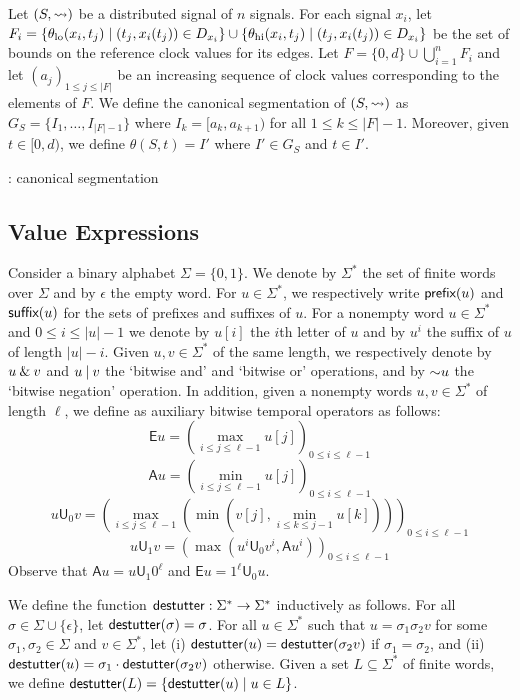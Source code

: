 Let $(S,{\rightsquigarrow})$ be a distributed signal of $n$ signals.
For each signal $x_i$, let $F_i = \{\theta_{\text{lo}}(x_i, t_j) \st (t_j, x_i(t_j)) \in D_{x_i}\} \cup \{\theta_{\text{hi}}(x_i, t_j) \st (t_j, x_i(t_j)) \in D_{x_i}\}$ be the set of bounds on the reference clock values for its edges.
Let $F = \{0, d\} \cup \bigcup_{i = 1}^{n} F_i$ and let $(a_j)_{1 \leq j \leq |F|}$ be an increasing sequence of clock values corresponding to the elements of $F$.
We define the canonical segmentation of $(S,{\rightsquigarrow})$ as $G_S = \{I_1, \ldots, I_{|F| - 1}\}$ where $I_k = [a_k, a_{k+1})$ for all $1 \leq k \leq |F| - 1$.
Moreover, given $t \in [0,d)$, we define $\theta(S,t) = I'$ where $I' \in G_S$ and $t \in I'$.

\begin{example}
	\TODO: canonical segmentation
\end{example}

\subsection{Value Expressions}

Consider a binary alphabet $\Sigma = \{0,1\}$.
We denote by $\Sigma^*$ the set of finite words over $\Sigma$ and by $\epsilon$ the empty word.
For $u \in \Sigma^*$, we respectively write $\textsf{prefix}(u)$ and $\textsf{suffix}(u)$ for the sets of prefixes and suffixes of $u$.
For a nonempty word $u \in \Sigma^*$ and $0 \leq i \leq |u| - 1$ we denote by $u[i]$ the $i$th letter of $u$ and by $u^i$ the suffix of $u$ of length $|u| - i$. 
Given $u,v \in \Sigma^*$ of the same length, we respectively denote by $u \mathbin{\&} v$ and $u \mathbin{|} v$ the `bitwise and' and `bitwise or' operations, and by $\mathord{\sim} u$ the `bitwise negation' operation.
In addition, given a nonempty words $u,v \in \Sigma^*$ of length $\ell$, we define as auxiliary bitwise temporal operators as follows:
$$ \mathsf{E} u = \left( \max_{i \leq j \leq \ell - 1} u[j] \right)_{0 \leq i \leq \ell - 1} $$
$$ \mathsf{A} u = \left( \min_{i \leq j \leq \ell - 1} u[j] \right)_{0 \leq i \leq \ell - 1} $$
$$ u \mathsf{U}_0 v = \left( \max_{i \leq j \leq \ell - 1} \left( \min \left( v[j], \min_{i \leq k \leq j - 1} u[k] \right) \right) \right)_{0 \leq i \leq \ell - 1} $$
$$ u \mathsf{U}_1 v = \left( \max \left( u^i \mathsf{U}_0 v^i, \mathsf{A} u^i \right) \right)_{0 \leq i \leq \ell - 1} $$
Observe that $\mathsf{A} u = u \mathsf{U}_1 0^\ell$ and $\mathsf{E} u = 1^\ell \mathsf{U}_0 u$.

We define the function $\mathsf{destutter} : \Sigma^* \to \Sigma^*$ inductively as follows.
For all $\sigma \in \Sigma \cup \{\epsilon\}$, let $\mathsf{destutter}(\sigma) = \sigma$.
For all $u \in \Sigma^*$ such that $u = \sigma_1 \sigma_2 v$ for some $\sigma_1,\sigma_2 \in \Sigma$ and $v \in \Sigma^*$, let (i) $\mathsf{destutter}(u) = \mathsf{destutter}(\sigma_2 v)$ if $\sigma_1 = \sigma_2$, and (ii) $\mathsf{destutter}(u) = \sigma_1 \cdot \mathsf{destutter}(\sigma_2 v)$ otherwise.
Given a set $L \subseteq \Sigma^*$ of finite words, we define $\destutter(L) = \{\destutter(u) \st u \in L\}$.

